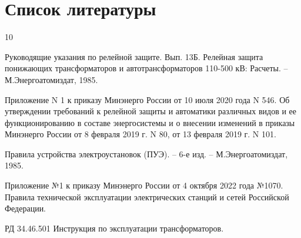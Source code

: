 {\color{unimain}\section[Список литературы]{Список литературы}}
\color{black}

\makeatletter
\providecommand{\bibsection}{}   %
\renewcommand{\bibsection}{}      %
\makeatother

\begin{thebibliography}{10}

	Руководящие указания по релейной защите. Вып. 13Б. Релейная защита понижающих трансформаторов и автотрансформаторов 110-500 кВ: Расчеты. – М.Энергоатомиздат, 1985.

	Приложение N 1 к приказу Минэнерго России от 10 июля 2020 года N 546. Об утверждении требований к релейной защиты и автоматики различных видов и ее функционированию в составе энергосистемы и о внесении изменений в приказы Минэнерго России от 8 февраля 2019 г. N 80, от 13 февраля 2019 г. N 101.

	Правила устройства электроустановок (ПУЭ). – 6-е изд. – М.Энергоатомиздат, 1985.

	Приложение №1 к приказу Минэнерго России от 4 октября 2022 года №1070. Правила технической эксплуатации электрических станций и сетей Российской Федерации.

	РД 34.46.501 Инструкция по эксплуатации трансформаторов.

\end{thebibliography}